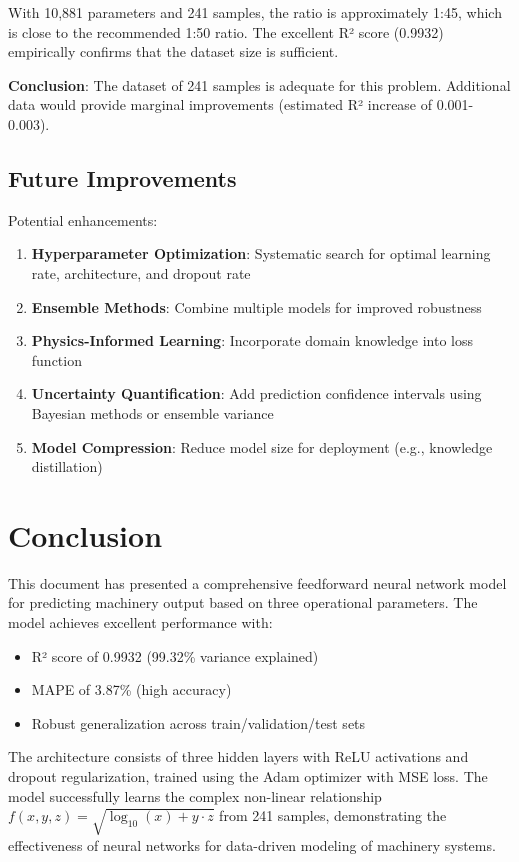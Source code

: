 \documentclass[12pt,a4paper]{article}
\begin{document}
With 10,881 parameters and 241 samples, the ratio is approximately 1:45, which is close to the recommended 1:50 ratio. The excellent R² score (0.9932) empirically confirms that the dataset size is sufficient.

\textbf{Conclusion}: The dataset of 241 samples is adequate for this problem. Additional data would provide marginal improvements (estimated R² increase of 0.001-0.003).

\subsection{Future Improvements}

Potential enhancements:

\begin{enumerate}
    \item \textbf{Hyperparameter Optimization}: Systematic search for optimal learning rate, architecture, and dropout rate
    \item \textbf{Ensemble Methods}: Combine multiple models for improved robustness
    \item \textbf{Physics-Informed Learning}: Incorporate domain knowledge into loss function
    \item \textbf{Uncertainty Quantification}: Add prediction confidence intervals using Bayesian methods or ensemble variance
    \item \textbf{Model Compression}: Reduce model size for deployment (e.g., knowledge distillation)
\end{enumerate}

\section{Conclusion}

This document has presented a comprehensive feedforward neural network model for predicting machinery output based on three operational parameters. The model achieves excellent performance with:

\begin{itemize}
    \item R² score of 0.9932 (99.32\% variance explained)
    \item MAPE of 3.87\% (high accuracy)
    \item Robust generalization across train/validation/test sets
\end{itemize}

The architecture consists of three hidden layers with ReLU activations and dropout regularization, trained using the Adam optimizer with MSE loss. The model successfully learns the complex non-linear relationship $f(x,y,z) = \sqrt{\log_{10}(x) + y \cdot z}$ from 241 samples, demonstrating the effectiveness of neural networks for data-driven modeling of machinery systems.
\end{document}
